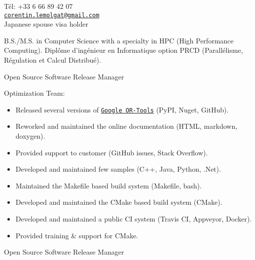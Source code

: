 \documentclass{article}
\begin{document}


T\'{e}l: +33 6 66 89 42 07\\
\href{mailto:corentin.lemolgat@gmail.com}{\texttt{corentin.lemolgat@gmail.com}}\\
Japanese spouse visa holder\\

\begin{llist}
 
 {
B.S./M.S. in Computer Science with a specialty in HPC (High Performance Computing).
} {
Dipl\^{o}me d'ing\'{e}nieur en Informatique option PRCD (Parall\'{e}lisme,
R\'{e}gulation et Calcul Distribu\'{e}).
}

 {
} {
}
\vspace{-0.33cm}

 {
Open Source Software Release Manager \\
\vspace{-0.33cm}

Optimization Team:
\vspace{-0.33cm}
\begin{itemize}
	\item Released several versions of \href{https://github.com/google/or-tools}{\texttt{Google OR-Tools}} (PyPI, Nuget, GitHub).
	\item Reworked and maintained the online documentation (HTML, markdown, doxygen).
	\item Provided support to customer (GitHub issues, Stack Overflow).
	\item Developed and maintained few samples (C++, Java, Python, .Net).
	\item Maintained the Makefile based build system (Makefile, bash).
	\item Developed and maintained the CMake based build system (CMake).
	\item Developed and maintained a public CI system (Travis CI, Appveyor, Docker).
	\item Provided training \& support for CMake.
\end{itemize}
} {
Open Source Software Release Manager \\
\vspace{-0.33cm}

}
\end{llist}
\end{document}
